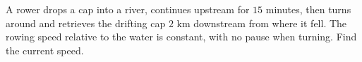 A rower drops a cap into a river, continues upstream for $15$ minutes, then turns around and retrieves the drifting cap $2$ km downstream from where it fell. The rowing speed relative to the water is constant, with no pause when turning. Find the current speed.
